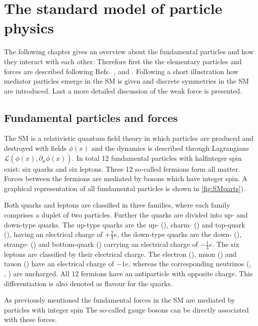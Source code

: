 \chapter{The standard model of particle physics}
\label{chap:SM}

The following chapter gives an overview about the fundamental particles and how they interact with each other. Therefore first
the the elementary particles and forces are described following Refs.~\cite{Griffiths:111880}, \cite{Perkins:396126} and
\cite{Peskin:257493}. Following a short illustration how mediator particles emerge in the \ac{SM} is given and discrete symmetries
in the \ac{SM} are introduced. Last a more detailed discussion of the weak force is presented.

\section{Fundamental particles and forces}
\label{sec:fundamentalparts}

The \ac{SM} is a relativistic quantum field theory in which particles are produced and destroyed with fields $\phi(x)$ and the
dynamics is described through Lagrangians $\mathcal{L}\left(\phi(x),\partial_{\mu}\phi(x)\right)$. In total \num{12} fundamental
particles with halfinteger spin exist: six quarks and six leptons. These \num{12} so-called fermions form all matter. Forces
between the fermions are mediated by bosons which have integer spin. A graphical representation of all fundamental particles is
shown in \cref{fig:SMparts}).

Both quarks and leptons are classified in three families, where each family comprises a duplet of two particles. Further the quarks
are divided into up- and down-type quarks. The up-type quarks are the up- (\uquark), charm- (\cquark) and top-quark (\tquark), having
an electrical charge of $+\frac{2}{3}e$, the down-type quarks are the down- (\dquark), strange- (\squark) and bottom-quark (\bquark)
carrying an electrical charge of $-\frac{1}{3}e$. The six leptons are classified by their electrical charge. The electron  (\electron),
muon (\muon) and tauon (\tauon) have an electrical charge of $-1e$, whereas the corresponding neutrinos (\neue, \neum, \neut) are
uncharged. All \num{12} fermions have an antiparticle with opposite charge. This differentiation is also denoted as flavour for the
quarks.

As previously mentioned the fundamental forces in the \ac{SM} are mediated by particles with integer spin The so-called gauge bosons
can be directly associated with these forces.

